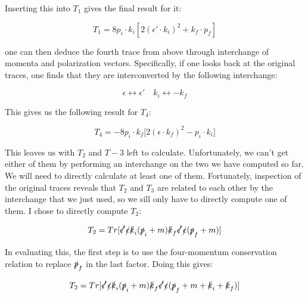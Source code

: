 \documentclass[a4]{article}
\begin{document}
    Inserting this into $T_1$ gives the final result for it:

    \begin{framed}
        \begin{equation}
            T_1 = 8 p_i \cdot k_i [2 (\epsilon' \cdot k_i)^2 + k_f \cdot p_f]
        \end{equation}
    \end{framed}

    one can then deduce the fourth trace from above through interchange of momenta and polarization vectors. Specifically, if one looks back at the original traces, one finds that
    they are interconverted by the following interchange:

    \begin{equation}
        \epsilon \leftrightarrow \epsilon' \quad k_i \leftrightarrow - k_f
    \end{equation}

    This gives us the following result for $T_4$:

    \begin{framed}
        \begin{equation}
            T_4 = - 8 p_i \cdot k_f \big[ 2 (\epsilon \cdot k_f)^2 - p_i \cdot k_i \big]
        \end{equation}
    \end{framed}

    This leaves us with $T_2$ and $T-3$ left to calculate. Unfortunately, we can't get either of them by performing an interchange on the two we have computed so far. We will need
    to directly calculate at least one of them. Fortunately, inspection of the original traces reveals that $T_2$ and $T_3$ are related to each other by the interchange that we just
    used, so we sill only have to directly compute one of them. I chose to directly compute $T_2$:

    \begin{equation}
        T_2 = Tr [ \slashed{\epsilon'} \slashed{\epsilon} \slashed{k}_i (\slashed{p}_i + m) \slashed{k}_f \slashed{\epsilon'} \slashed{\epsilon} (\slashed{p}_f + m) ]
    \end{equation}

    In evaluating this, the first step is to use the four-momentum conservation relation to replace $\slashed{p}_f$ in the last factor. Doing this gives:

    \begin{equation}
        T_2 = Tr [ \slashed{\epsilon'} \slashed{\epsilon} \slashed{k}_i (\slashed{p}_i + m) \slashed{k}_f \slashed{\epsilon'} \slashed{\epsilon} (\slashed{p}_f + m + \slashed{k}_i + \slashed{k}_f) ]
    \end{equation}
\end{document}
